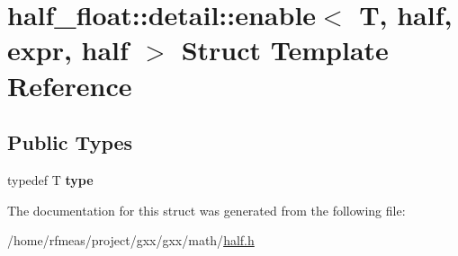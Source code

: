 \hypertarget{structhalf__float_1_1detail_1_1enable_3_01T_00_01half_00_01expr_00_01half_01_4}{}\section{half\+\_\+float\+:\+:detail\+:\+:enable$<$ T, half, expr, half $>$ Struct Template Reference}
\label{structhalf__float_1_1detail_1_1enable_3_01T_00_01half_00_01expr_00_01half_01_4}
\subsection*{Public Types}
\begin{DoxyCompactItemize}
\item 
typedef T {\bfseries type}\hypertarget{structhalf__float_1_1detail_1_1enable_3_01T_00_01half_00_01expr_00_01half_01_4_a80132f08c75c820e5b592597050e161f}{}\label{structhalf__float_1_1detail_1_1enable_3_01T_00_01half_00_01expr_00_01half_01_4_a80132f08c75c820e5b592597050e161f}

\end{DoxyCompactItemize}


The documentation for this struct was generated from the following file\+:\begin{DoxyCompactItemize}
\item 
/home/rfmeas/project/gxx/gxx/math/\hyperlink{half_8h}{half.\+h}\end{DoxyCompactItemize}
